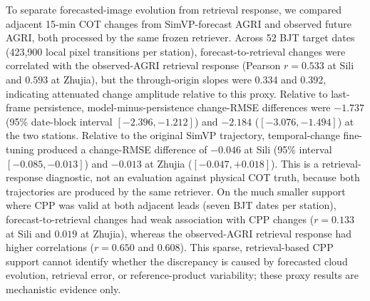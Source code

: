 \documentclass[11pt]{article}
\begin{document}
To separate forecasted-image evolution from retrieval response, we compared adjacent 15-min COT changes from SimVP-forecast AGRI and observed future AGRI, both processed by the same frozen retriever. Across 52 BJT target dates (423,900 local pixel transitions per station), forecast-to-retrieval changes were correlated with the observed-AGRI retrieval response (Pearson $r=0.533$ at Sili and $0.593$ at Zhujia), but the through-origin slopes were 0.334 and 0.392, indicating attenuated change amplitude relative to this proxy. Relative to last-frame persistence, model-minus-persistence change-RMSE differences were $-1.737$ (95\% date-block interval $[-2.396,-1.212]$) and $-2.184$ ($[-3.076,-1.494]$) at the two stations. Relative to the original SimVP trajectory, temporal-change fine-tuning produced a change-RMSE difference of $-0.046$ at Sili (95\% interval $[-0.085,-0.013]$) and $-0.013$ at Zhujia ($[-0.047,+0.018]$). This is a retrieval-response diagnostic, not an evaluation against physical COT truth, because both trajectories are produced by the same retriever. On the much smaller support where CPP was valid at both adjacent leads (seven BJT dates per station), forecast-to-retrieval changes had weak association with CPP changes ($r=0.133$ at Sili and $0.019$ at Zhujia), whereas the observed-AGRI retrieval response had higher correlations ($r=0.650$ and $0.608$). This sparse, retrieval-based CPP support cannot identify whether the discrepancy is caused by forecasted cloud evolution, retrieval error, or reference-product variability; these proxy results are mechanistic evidence only.
\FloatBarrier
\end{document}

